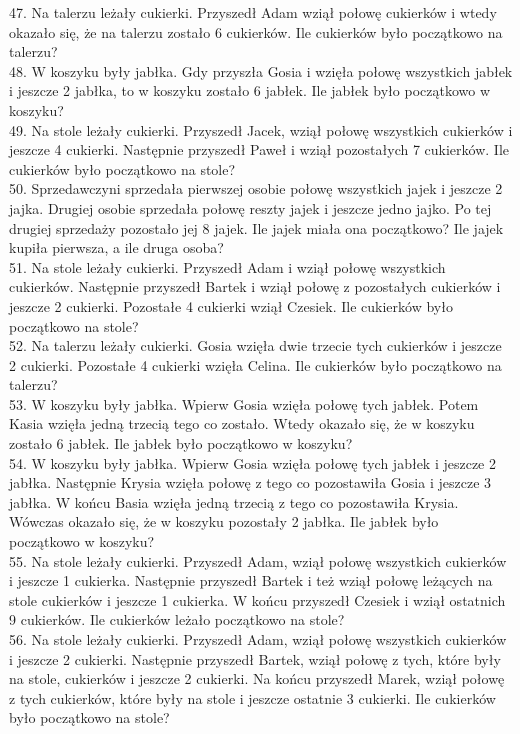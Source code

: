 \documentclass[10pt]{article}
\begin{document}
47. Na talerzu leżały cukierki. Przyszedł Adam wziął połowę cukierków i wtedy okazało się, że na talerzu zostało 6 cukierków. Ile cukierków było początkowo na talerzu?\\
48. W koszyku były jabłka. Gdy przyszła Gosia i wzięła połowę wszystkich jabłek i jeszcze 2 jabłka, to w koszyku zostało 6 jabłek. Ile jabłek było początkowo w koszyku?\\
49. Na stole leżały cukierki. Przyszedł Jacek, wziął połowę wszystkich cukierków i jeszcze 4 cukierki. Następnie przyszedł Paweł i wziął pozostałych 7 cukierków. Ile cukierków było początkowo na stole?\\
50. Sprzedawczyni sprzedała pierwszej osobie połowę wszystkich jajek i jeszcze 2 jajka. Drugiej osobie sprzedała połowę reszty jajek i jeszcze jedno jajko. Po tej drugiej sprzedaży pozostało jej 8 jajek. Ile jajek miała ona początkowo? Ile jajek kupiła pierwsza, a ile druga osoba?\\
51. Na stole leżały cukierki. Przyszedł Adam i wziął połowę wszystkich cukierków. Następnie przyszedł Bartek i wziął połowę z pozostałych cukierków i jeszcze 2 cukierki. Pozostałe 4 cukierki wziął Czesiek. Ile cukierków było początkowo na stole?\\
52. Na talerzu leżały cukierki. Gosia wzięła dwie trzecie tych cukierków i jeszcze 2 cukierki. Pozostałe 4 cukierki wzięła Celina. Ile cukierków było początkowo na talerzu?\\
53. W koszyku były jabłka. Wpierw Gosia wzięła połowę tych jabłek. Potem Kasia wzięła jedną trzecią tego co zostało. Wtedy okazało się, że w koszyku zostało 6 jabłek. Ile jabłek było początkowo w koszyku?\\
54. W koszyku były jabłka. Wpierw Gosia wzięła połowę tych jabłek i jeszcze 2 jabłka. Następnie Krysia wzięła połowę z tego co pozostawiła Gosia i jeszcze 3 jabłka. W końcu Basia wzięła jedną trzecią z tego co pozostawiła Krysia. Wówczas okazało się, że w koszyku pozostały 2 jabłka. Ile jabłek było początkowo w koszyku?\\
55. Na stole leżały cukierki. Przyszedł Adam, wziął połowę wszystkich cukierków i jeszcze 1 cukierka. Następnie przyszedł Bartek i też wziął połowę leżących na stole cukierków i jeszcze 1 cukierka. W końcu przyszedł Czesiek i wziął ostatnich 9 cukierków. Ile cukierków leżało początkowo na stole?\\
56. Na stole leżały cukierki. Przyszedł Adam, wziął połowę wszystkich cukierków i jeszcze 2 cukierki. Następnie przyszedł Bartek, wziął połowę z tych, które były na stole, cukierków i jeszcze 2 cukierki. Na końcu przyszedł Marek, wziął połowę z tych cukierków, które były na stole i jeszcze ostatnie 3 cukierki. Ile cukierków było początkowo na stole?\\
\end{document}
